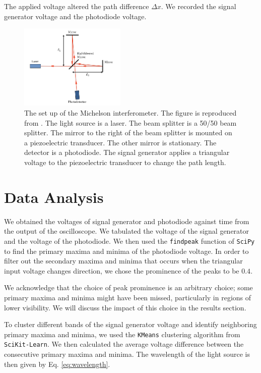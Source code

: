 The applied voltage altered the path difference $\Delta x$. We recorded the signal generator voltage and the photodiode voltage. 
\begin{figure}[h]
    \centering
    \includegraphics[width=0.45\textwidth]{fig/michelson_setup.png}
    \caption{The set up of the Michelson interferometer. The figure is reproduced from \cite{MITOpticalInterferometry2023}. The light source is a laser. The beam splitter is a 50/50 beam splitter. The mirror to the right of the beam splitter is mounted on a piezoelectric transducer. The other mirror is stationary. The detector is a photodiode. The signal generator applies a triangular voltage to the piezoelectric transducer to change the path length.}
    \label{fig:set_up}
\end{figure}

\section{Data Analysis}
We obtained the voltages of signal generator and photodiode against time from the output of the oscilloscope. We tabulated the voltage of the signal generator and the voltage of the photodiode. We then used the \texttt{findpeak} function of \texttt{SciPy} to find the primary maxima and minima of the photodiode voltage. In order to filter out the secondary maxima and minima that occurs when the triangular input voltage changes direction, we chose the prominence of the peaks to be $0.4$. 

We acknowledge that the choice of peak prominence is an arbitrary choice; some primary maxima and minima might have been missed, particularly in regions of lower visibility. We will discuss the impact of this choice in the results section.

To cluster different bands of the signal generator voltage and identify neighboring primary maxima and minima, we used the \texttt{KMeans} clustering algorithm from \texttt{SciKit-Learn}. We then calculated the average voltage difference between the consecutive primary maxima and minima. The wavelength of the light source is then given by Eq. \eqref{eq:wavelength}. 


